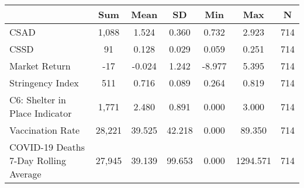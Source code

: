 {
\def\sym#1{\ifmmode^{#1}\else\(^{#1}\)\fi}
\begin{tabular}{l*{1}{cccccc}}
\toprule
                    &         Sum&        Mean&          SD&         Min&         Max&           N\\
\midrule
CSAD                &       1,088&       1.524&       0.360&       0.732&       2.923&         714\\
CSSD                &          91&       0.128&       0.029&       0.059&       0.251&         714\\
Market Return       &         -17&      -0.024&       1.242&      -8.977&       5.395&         714\\
Stringency Index    &         511&       0.716&       0.089&       0.264&       0.819&         714\\
C6: Shelter in Place Indicator&       1,771&       2.480&       0.891&       0.000&       3.000&         714\\
Vaccination Rate    &      28,221&      39.525&      42.218&       0.000&      89.350&         714\\
COVID-19 Deaths 7-Day Rolling Average&      27,945&      39.139&      99.653&       0.000&    1294.571&         714\\
\bottomrule
\end{tabular}
}
